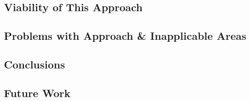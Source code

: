 \chapter{}

\section{Viability of This Approach}

\section{Problems with Approach \& Inapplicable Areas}

\section{Conclusions}

\section{Future Work}